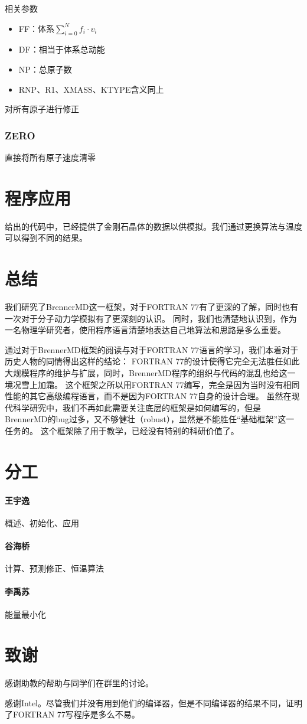 \documentclass{ctexart}
\begin{document}
\noindent
相关参数

\begin{itemize}
    \item FF：体系$\sum^N_{i=0}f_i\cdot v_i$
    \item DF：相当于体系总动能
    \item NP：总原子数
    \item RNP、R1、XMASS、KTYPE含义同上
\end{itemize}

对所有原子进行修正

\subsubsection{ZERO}

直接将所有原子速度清零

\section{程序应用}
给出的代码中，已经提供了金刚石晶体的数据以供模拟。我们通过更换算法与温度可以得到不同的结果。

\section{总结}
我们研究了BrennerMD这一框架，对于FORTRAN 77有了更深的了解，同时也有一次对于分子动力学模拟有了更深刻的认识。
同时，我们也清楚地认识到，作为一名物理学研究者，使用程序语言清楚地表达自己地算法和思路是多么重要。

通过对于BrennerMD框架的阅读与对于FORTRAN 77语言的学习，我们本着对于历史人物的同情得出这样的结论：
FORTRAN 77的设计使得它完全无法胜任如此大规模程序的维护与扩展，同时，BrennerMD程序的组织与代码的混乱也给这一境况雪上加霜。
这个框架之所以用FORTRAN 77编写，完全是因为当时没有相同性能的其它高级编程语言，而不是因为FORTRAN 77自身的设计合理。
虽然在现代科学研究中，我们不再如此需要关注底层的框架是如何编写的，但是BrennerMD的bug过多，又不够健壮（robust），显然是不能胜任“基础框架”这一任务的。
这个框架除了用于教学，已经没有特别的科研价值了。

\section{分工}
\paragraph{王宇逸}概述、初始化、应用
\paragraph{谷海桥}计算、预测修正、恒温算法
\paragraph{李禹苏}能量最小化

\section{致谢}
感谢助教的帮助与同学们在群里的讨论。

感谢Intel。尽管我们并没有用到他们的编译器，但是不同编译器的结果不同，证明了FORTRAN 77写程序是多么不易。
\end{document}
